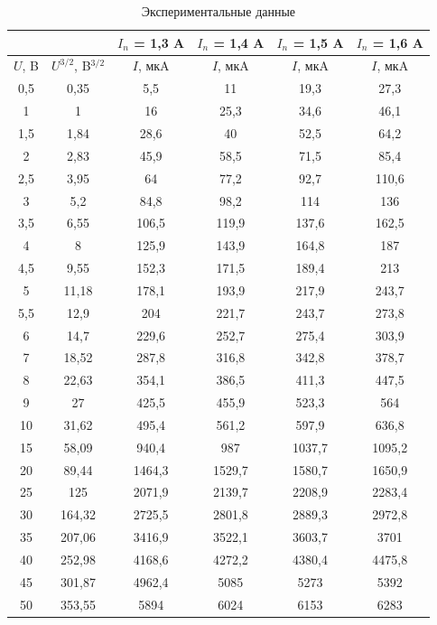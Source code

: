 \documentclass[a4paper,12pt]{article}
\begin{document}
\begin{table}[h!]
	\centering
	\caption{ Экспериментальные данные }

\begin{tabular}{|c|c|c|c|c|c|}
	\hline 
	& & $I_n$ = 1,3 A & $I_n$ = 1,4 A & $I_n$ = 1,5 A & $I_n$ = 1,6 A \\ 
	\hline 
	$U$, B & $U^{3/2}$, B$^{3/2}$ & $I$, мкA & $I$, мкA & $I$, мкA & $I$, мкA \\ 
	\hline 
	0,5 & 0,35 & 5,5 & 11 & 19,3 & 27,3 \\ 
	\hline 
	1 & 1 & 16 & 25,3 & 34,6 & 46,1 \\ 
	\hline 
	1,5 & 1,84 & 28,6 & 40 & 52,5 & 64,2 \\ 
	\hline 
	2 & 2,83 & 45,9 & 58,5 & 71,5 & 85,4 \\ 
	\hline 
	2,5 & 3,95 & 64 & 77,2 & 92,7 & 110,6 \\ 
	\hline 
	3 & 5,2 & 84,8 & 98,2 & 114 & 136 \\ 
	\hline 
	3,5 & 6,55 & 106,5 & 119,9 & 137,6 & 162,5 \\ 
	\hline 
	4 & 8 & 125,9 & 143,9 & 164,8 & 187 \\ 
	\hline 
	4,5 & 9,55 & 152,3 & 171,5 & 189,4 & 213 \\ 
	\hline 
	5 & 11,18 & 178,1 & 193,9 & 217,9 & 243,7 \\ 
	\hline 
	5,5 & 12,9 & 204 & 221,7 & 243,7 & 273,8 \\ 
	\hline 
	6 & 14,7 & 229,6 & 252,7 & 275,4 & 303,9 \\ 
	\hline 
	7 & 18,52 & 287,8 & 316,8 & 342,8 & 378,7 \\ 
	\hline 
	8 & 22,63 & 354,1 & 386,5 & 411,3 & 447,5 \\ 
	\hline 
	9 & 27 & 425,5 & 455,9 & 523,3 & 564 \\ 
	\hline 
	10 & 31,62 & 495,4 & 561,2 & 597,9 & 636,8 \\ 
	\hline 
	15 & 58,09 & 940,4 & 987 & 1037,7 & 1095,2 \\ 
	\hline 
	20 & 89,44 & 1464,3 & 1529,7 & 1580,7 & 1650,9 \\ 
	\hline 
	25 & 125 & 2071,9 & 2139,7 & 2208,9 & 2283,4 \\ 
	\hline 
	30 & 164,32 & 2725,5 & 2801,8 & 2889,3 & 2972,8 \\ 
	\hline 
	35 & 207,06 & 3416,9 & 3522,1 & 3603,7 & 3701 \\ 
	\hline 
	40 & 252,98 & 4168,6 & 4272,2 & 4380,4 & 4475,8 \\ 
	\hline 
	45 & 301,87 & 4962,4 & 5085 & 5273 & 5392 \\ 
	\hline 
	50 & 353,55 & 5894 & 6024 & 6153 & 6283 \\ 
	\hline  
\end{tabular} 
\end{table}
\end{document}
